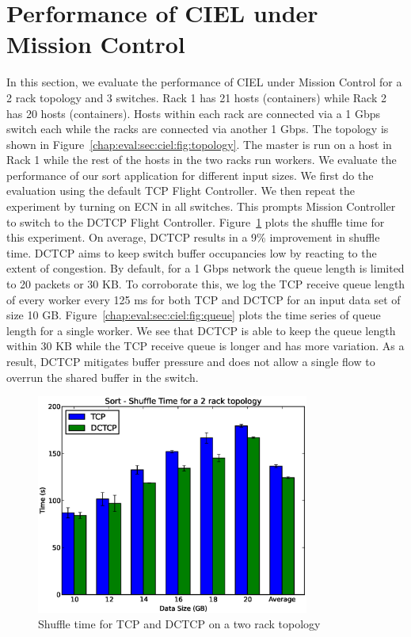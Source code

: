 \documentclass[a4paper,12pt,twoside,openright]{report}
\begin{document}
\section{Performance of CIEL under Mission Control}
In this section, we evaluate the performance of CIEL under Mission Control for a
2 rack topology and 3 switches. Rack 1 has 21 hosts (containers) while Rack 2
has 20 hosts (containers). Hosts within each rack are connected via a 1 Gbps
switch each while the racks are connected via another 1 Gbps. The topology is
shown in Figure~\ref{chap:eval:sec:ciel:fig:topology}. The master is run on a
host in Rack 1 while the rest of the hosts in the two racks run workers. We
evaluate the performance of our sort application for different input sizes. We
first do the evaluation using the default TCP Flight Controller. We then repeat
the experiment by turning on ECN in all switches. This prompts Mission
Controller to switch to the DCTCP Flight Controller.
Figure~\ref{chap:eval:sec:ciel:fig:shuffle2racks} plots the shuffle time for
this experiment. On average, DCTCP results in a 9\% improvement in shuffle time.
DCTCP aims to keep switch buffer occupancies low by reacting to the extent of
congestion. By default, for a 1 Gbps network the queue length is limited to 20
packets or 30 KB. To corroborate this, we log the TCP receive queue length of
every worker every 125 ms for both TCP and DCTCP for an input data set of size
10 GB. Figure~\ref{chap:eval:sec:ciel:fig:queue} plots the time series of queue
length for a single worker. We see that DCTCP is able to keep the queue length
within 30 KB while the TCP receive queue is longer and has more variation. As a
result, DCTCP mitigates buffer pressure and does not allow a single flow to
overrun the shared buffer in the switch.


\begin{figure}[h!]
  \centering
    \includegraphics[width=0.8\textwidth]{shuffle_sort_dctcp_2racks.eps}
    \caption{Shuffle time for TCP and DCTCP on a two rack topology}
    \label{chap:eval:sec:ciel:fig:shuffle2racks}
\end{figure}
\end{document}
